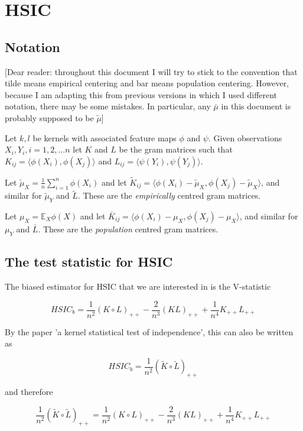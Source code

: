 \documentclass{article}
\begin{document}
\section{HSIC}
\subsection{Notation}
\begin{center}
[Dear reader: throughout this document I will try to stick to the convention that tilde means empirical centering and bar means population centering. However, because I am adapting this from previous versions in which I used different notation, there may be some mistakes. In particular, any $\bar{\mu}$ in this document is probably supposed to be $\tilde{\mu}$]
\end{center}

Let $k, l$ be kernels with associated feature maps $\phi$ and $\psi$. Given observations $X_i, Y_i, i=1,2,\ldots n$ let $K$ and $L$ be the gram matrices such that $K_{ij} = \langle \phi(X_i),\phi(X_j) \rangle$ and $L_{ij} = \langle \psi(Y_i),\psi(Y_j) \rangle$. 

Let $\tilde{\mu}_X = \frac{1}{n}\sum_{i=1}^{n} \phi(X_i)$ and let $\tilde{K}_{ij} = \langle \phi(X_i) - \tilde{\mu}_X, \phi(X_j) - \tilde{\mu}_X \rangle$, and similar for $\tilde{\mu}_Y$ and $\tilde{L}$. These are the \emph{empirically} centred gram matrices.

Let $\mu_X = \mathbb{E}_X\phi(X)$ and let $\bar{K}_{ij} = \langle \phi(X_i) - \mu_X, \phi(X_j) - \mu_X \rangle$, and similar for $\mu_Y$ and $\bar{L}$. These are the \emph{population} centred gram matrices.

\subsection{The test statistic for HSIC}
The biased estimator for HSIC that we are interested in is the V-statistic

\[ HSIC_b = \frac{1}{n^2}(K\circ L)_{++} - \frac{2}{n^3}(KL)_{++} + \frac{1}{n^4}K_{++}L_{++}\]

By the paper 'a kernel statistical test of independence', this can also be written as

\[ HSIC_b = \frac{1}{n^2}(\tilde{K}\circ\tilde{L})_{++}\]

and therefore

\[\frac{1}{n^2}(\tilde{K}\circ\tilde{L})_{++} = \frac{1}{n^2}(K\circ L)_{++} - \frac{2}{n^3}(KL)_{++} + \frac{1}{n^4}K_{++}L_{++}\]
\end{document}
